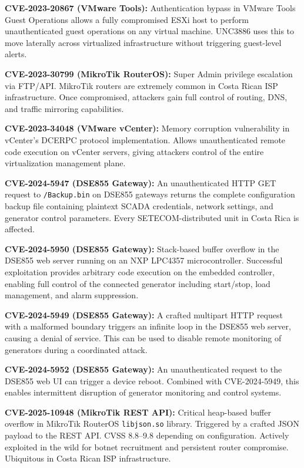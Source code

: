 \documentclass[11pt,a4paper]{article}
\begin{document}
\textbf{CVE-2023-20867 (VMware Tools):} Authentication bypass in VMware Tools Guest Operations allows a fully compromised ESXi host to perform unauthenticated guest operations on any virtual machine. UNC3886 uses this to move laterally across virtualized infrastructure without triggering guest-level alerts.

\textbf{CVE-2023-30799 (MikroTik RouterOS):} Super Admin privilege escalation via FTP/API. MikroTik routers are extremely common in Costa Rican ISP infrastructure. Once compromised, attackers gain full control of routing, DNS, and traffic mirroring capabilities.

\textbf{CVE-2023-34048 (VMware vCenter):} Memory corruption vulnerability in vCenter's DCERPC protocol implementation. Allows unauthenticated remote code execution on vCenter servers, giving attackers control of the entire virtualization management plane.

\textbf{CVE-2024-5947 (DSE855 Gateway):} An unauthenticated HTTP GET request to \texttt{/Backup.bin} on DSE855 gateways returns the complete configuration backup file containing plaintext SCADA credentials, network settings, and generator control parameters. Every SETECOM-distributed unit in Costa Rica is affected.

\textbf{CVE-2024-5950 (DSE855 Gateway):} Stack-based buffer overflow in the DSE855 web server running on an NXP LPC4357 microcontroller. Successful exploitation provides arbitrary code execution on the embedded controller, enabling full control of the connected generator including start/stop, load management, and alarm suppression.

\textbf{CVE-2024-5949 (DSE855 Gateway):} A crafted multipart HTTP request with a malformed boundary triggers an infinite loop in the DSE855 web server, causing a denial of service. This can be used to disable remote monitoring of generators during a coordinated attack.

\textbf{CVE-2024-5952 (DSE855 Gateway):} An unauthenticated request to the DSE855 web UI can trigger a device reboot. Combined with CVE-2024-5949, this enables intermittent disruption of generator monitoring and control systems.

\textbf{CVE-2025-10948 (MikroTik REST API):} Critical heap-based buffer overflow in MikroTik RouterOS \texttt{libjson.so} library. Triggered by a crafted JSON payload to the REST API. CVSS 8.8--9.8 depending on configuration. Actively exploited in the wild for botnet recruitment and persistent router compromise. Ubiquitous in Costa Rican ISP infrastructure.
\end{document}
